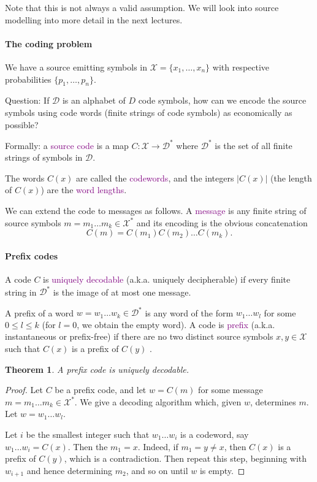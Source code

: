 \documentclass[a4paper, 11pt, openany]{book}
\numberwithin{equation}{section}
\theoremstyle{plain}
\newtheorem{theorem}	[equation]	{Theorem}
\theoremstyle{definition}
\newcommand{\Define}[1]{\textcolor{purple}{#1}}
\begin{document}
Note that this is not always a valid assumption. We will look into source modelling into more detail in the next lectures.



\paragraph{The coding problem}


We have a source emitting symbols in $\mathcal{X} = \{x_1, \dots, x_n\}$ with respective probabilities  $\{p_1, \dots, p_n\}$.


Question: If  $\mathcal{D}$ is an alphabet of  $D$ code symbols, how can we encode the source symbols using code words (finite strings of code symbols) as economically as possible?

Formally: a \Define{source code} is a map $C : \mathcal{X} \to \mathcal{D}^*$
where  $\mathcal{D}^*$     is the set of all finite strings of symbols in  $\mathcal{D}$.

The words $C(x)$ are called the \Define{codewords}, and the integers $|C(x)|$ (the length of $C(x)$) are the \Define{word lengths}.


We can extend the code to messages as follows. A \Define{message} is any finite string of source symbols $m = m_1 \dots m_k \in \mathcal{X}^*$ and its encoding is the obvious concatenation 
\[
    C(m) = C(m_1) C(m_2) \dots C(m_k).
\]



\paragraph{Prefix codes}


A code $C$ is \Define{uniquely decodable} (a.k.a. uniquely decipherable) if every finite string in $\mathcal{D}^*$ is the image of at most one message. 

A prefix of a word $w = w_1 \dots w_k \in \mathcal{D}^*$ is any word of the form $w_1 \dots w_l$ for some $0 \le l \le k$ (for $l=0$, we obtain the empty word). A code is \Define{prefix} (a.k.a. instantaneous or prefix-free) if there are no two distinct source symbols $x, y \in \mathcal{X}$ such that $C(x)$ is a prefix of  $C(y)$         .

\begin{theorem}
A prefix code is uniquely decodable.
\end{theorem}

\begin{proof}
Let $C$ be a prefix code, and let $w = C(m)$ for some message $m = m_1 \dots m_k \in \mathcal{X}^*$. We give a decoding algorithm which, given $w$, determines $m$. Let $w = w_1 \dots w_l$.

Let $i$ be the smallest integer such that $w_1 \dots w_i$ is a codeword, say $w_1 \dots w_i = C(x)$. Then the $m_1 = x$. Indeed, if $m_1 = y \ne x$, then $C(x)$ is a prefix of $C(y)$, which is a contradiction. Then repeat this step, beginning with $w_{i+1}$ and hence determining $m_2$, and so on until $w$ is empty.
\end{proof}
\end{document}

